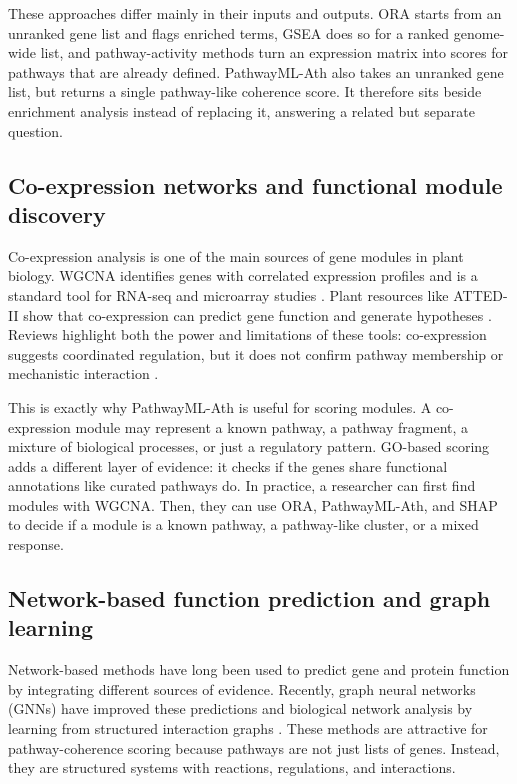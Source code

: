 \documentclass[12pt,twoside]{article}
\begin{document}
These approaches differ mainly in their inputs and outputs. ORA starts from an unranked gene list and flags enriched terms, GSEA does so for a ranked genome-wide list, and pathway-activity methods turn an expression matrix into scores for pathways that are already defined. PathwayML-Ath also takes an unranked gene list, but returns a single pathway-like coherence score. It therefore sits beside enrichment analysis instead of replacing it, answering a related but separate question.

\subsection{Co-expression networks and functional module discovery}
\label{sec:lit_coexpression_extended}

Co-expression analysis is one of the main sources of gene modules in plant biology. WGCNA identifies genes with correlated expression profiles and is a standard tool for RNA-seq and microarray studies \citep{langfelder2008wgcna}. Plant resources like ATTED-II show that co-expression can predict gene function and generate hypotheses \citep{obayashi2018atted}. Reviews highlight both the power and limitations of these tools: co-expression suggests coordinated regulation, but it does not confirm pathway membership or mechanistic interaction \citep{usadel2009coexpression}.

This is exactly why PathwayML-Ath is useful for scoring modules. A co-expression module may represent a known pathway, a pathway fragment, a mixture of biological processes, or just a regulatory pattern. GO-based scoring adds a different layer of evidence: it checks if the genes share functional annotations like curated pathways do. In practice, a researcher can first find modules with WGCNA. Then, they can use ORA, PathwayML-Ath, and SHAP to decide if a module is a known pathway, a pathway-like cluster, or a mixed response.

\subsection{Network-based function prediction and graph learning}
\label{sec:lit_networks_extended}

Network-based methods have long been used to predict gene and protein function by integrating different sources of evidence. Recently, graph neural networks (GNNs) have improved these predictions and biological network analysis by learning from structured interaction graphs \citep{muzio2021biological}. These methods are attractive for pathway-coherence scoring because pathways are not just lists of genes. Instead, they are structured systems with reactions, regulations, and interactions.
\end{document}
